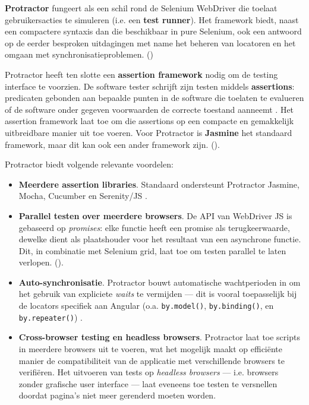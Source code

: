 \textbf{Protractor} fungeert als een schil rond de Selenium WebDriver die toelaat gebruikersacties te simuleren (i.e. een \textbf{test runner}). Het framework biedt, naast een compactere syntaxis dan die beschikbaar in pure Selenium, ook een antwoord op de eerder besproken uitdagingen met name het beheren van locatoren en het omgaan met synchronisatieproblemen. (\cite{ToolsQA2019})

Protractor heeft ten slotte een \textbf{assertion framework} nodig om de testing interface te voorzien. De software tester schrijft zijn testen middels \textbf{assertions}: predicaten gebonden aan bepaalde punten in de software die toelaten te evalueren of de software onder gegeven voorwaarden de correcte toestand aanneemt \autocite{Alakeel2014}. Het assertion framework laat toe om die assertions op een compacte en gemakkelijk uitbreidbare manier uit toe voeren. Voor Protractor is \textbf{Jasmine} het standaard framework, maar dit kan ook een ander framework zijn. (\cite{SoftwareTestingHelp}).

Protractor biedt volgende relevante voordelen:
\begin{itemize}
    \item \textbf{Meerdere assertion libraries}. Standaard ondersteunt Protractor Jasmine, Mocha, Cucumber en Serenity/JS \autocite{ProtractortestFrameworks}.
    \item \textbf{Parallel testen over meerdere browsers}. De API van WebDriver JS is gebaseerd op \emph{promises}: elke functie heeft een promise als terugkeerwaarde, dewelke dient als plaatshouder voor het resultaat van een asynchrone functie. Dit, in combinatie met Selenium grid, laat toe om testen parallel te laten verlopen. (\cite{ProtractortestControlflow,Kamothi2019,TutorialspointProtractor2020}).
    \item \textbf{Auto-synchronisatie}. Protractor bouwt automatische wachtperioden in om het gebruik van expliciete \emph{waits} te vermijden — dit is vooral toepasselijk bij de locators specifiek aan Angular (o.a. \texttt{by.model()}, \texttt{by.binding()}, en \texttt{by.repeater()}) \autocite{Jarif2018}.
    \item \textbf{Cross-browser testing en headless browsers}. Protractor laat toe scripts in meerdere browsers uit te voeren, wat het mogelijk maakt op efficiënte manier de compatibiliteit van de applicatie met verschillende browsers te verifiëren. Het uitvoeren van tests op \emph{headless browsers} — i.e. browsers zonder grafische user interface — laat eveneens toe testen te versnellen doordat pagina's niet meer gerenderd moeten worden. \autocite{ToolsQA2019}
\end{itemize}

